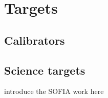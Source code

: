 \section{Targets}


\subsection{Calibrators}


\subsection{Science targets}
introduce the SOFIA work here

